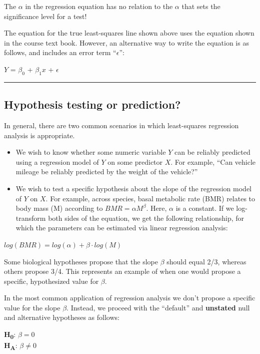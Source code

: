 \documentclass[
]{book}
\begin{document}
The \(\alpha\) in the regression equation has no relation to the \(\alpha\) that sets the significance level for a test!

The equation for the true least-squares line shown above uses the equation shown in the course text book. However, an alternative way to write the equation is as follows, and includes an error term ``\(\epsilon\)'':

\(Y\) = \(\beta_0\) + \(\beta_1\)\(x\) + \(\epsilon\)

\begin{center}\rule{0.5\linewidth}{0.5pt}\end{center}

\subsection{Hypothesis testing or prediction?}\label{LSR_hyp}

In general, there are two common scenarios in which least-squares regression analysis is appropriate.

\begin{itemize}
\item
  We wish to know whether some numeric variable \(Y\) can be reliably predicted using a regression model of \(Y\) on some predictor \(X\). For example, ``Can vehicle mileage be reliably predicted by the weight of the vehicle?''
\item
  We wish to test a specific hypothesis about the slope of the regression model of \(Y\) on \(X\). For example, across species, basal metabolic rate (BMR) relates to body mass (M) according to \(BMR = \alpha M^\beta\). Here, \(\alpha\) is a constant. If we log-transform both sides of the equation, we get the following relationship, for which the parameters can be estimated via linear regression analysis:
\end{itemize}

\(log(BMR) = log(\alpha) + \beta\cdot log(M)\)

Some biological hypotheses propose that the slope \(\beta\) should equal 2/3, whereas others propose 3/4. This represents an example of when one would propose a specific, hypothesized value for \(\beta\).

In the most common application of regression analysis we don't propose a specific value for the slope \(\beta\). Instead, we proceed with the ``default'' and \textbf{unstated} null and alternative hypotheses as follows:

\textbf{H\textsubscript{0}}: \(\beta = 0\)\\
\textbf{H\textsubscript{A}}: \(\beta \neq 0\)
\end{document}
